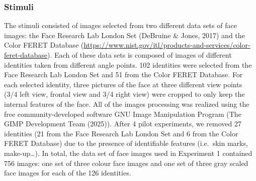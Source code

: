 \documentclass[
  letterpaper,
  DIV=11,
  numbers=noendperiod]{scrartcl}
\newcounter{none} %
\begin{document}
\begin{table}

\caption{\label{tbl-participants}Participant summary across
experiments.}


\end{table}%

\subsubsection{Stimuli}\label{stimuli}

The stimuli consisted of images selected from two different data sets of
face images: the Face Research Lab London Set (DeBruine \& Jones, 2017)
and the Color FERET Database
(\url{https://www.nist.gov/itl/products-and-services/color-feret-database}).
Each of these data sets is composed of images of different identities
taken from different angle points. 102 identities were selected from the
Face Research Lab London Set and 51 from the Color FERET Database. For
each selected identity, three pictures of the face at three different
view points (3/4 left view, frontal view and 3/4 right view) were
cropped to only keep the internal features of the face. All of the
images processing was realized using the free community-developed
software GNU Image Manipulation Program (The GIMP Development Team
(2025)). After 4 pilot experiments, we removed 27 identities (21 from
the Face Research Lab London Set and 6 from the Color FERET Database)
due to the presence of identifiable features (i.e.~skin marks,
make-up\ldots). In total, the data set of face images used in Experiment
1 contained 756 images: one set of three colour face images and one set
of three gray scaled face images for each of the 126 identities.
\end{document}
